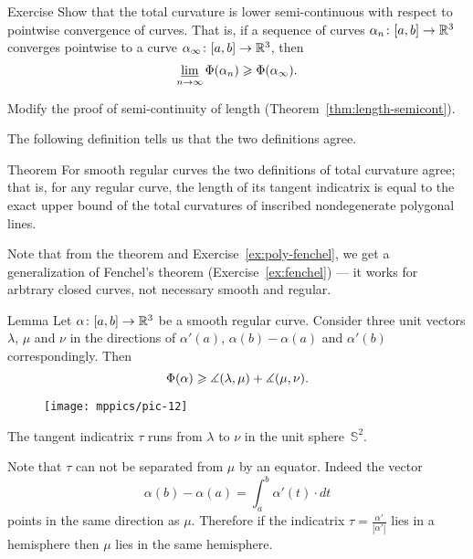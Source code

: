 \begin{thm}{Exercise}
Show that the total curvature is lower semi-continuous with respect to pointwise convergence of curves.
That is, if a sequence
of curves $\alpha_n\colon[a,b]\to \mathbb{R}^3$ converges pointwise 
to a curve $\alpha_\infty\:[a,b]\z\to \RR^3$, then 
\[\varliminf_{n\to\infty} \Phi({\alpha_n}) \geqslant \Phi({\alpha_\infty}).\]
\end{thm}

 Modify the proof of semi-continuity of length (Theorem~\ref{thm:length-semicont}).


The following definition tells us that the two definitions agree.

\begin{thm}{Theorem}\label{thm:total-curvature=}
For smooth regular curves the two definitions of total curvature agree;
that is, for any regular curve, the length of its tangent indicatrix is equal to the exact upper bound of the total curvatures of inscribed nondegenerate polygonal lines.
\end{thm}

Note that from the theorem and Exercise~\ref{ex:poly-fenchel}, we get a generalization of Fenchel's theorem (Exercise~\ref{ex:fenchel}) --- it works for arbtrary closed curves, not necessary smooth and regular.

\begin{thm}{Lemma}\label{lem:uvw}
Let $\alpha\colon[a,b]\to\mathbb{R}^3$ be a smooth regular curve.
Consider three unit vectors $\lambda$, $\mu$ and $\nu$ in the directions of
$\alpha'(a)$, $\alpha(b)-\alpha(a)$ and $\alpha'(b)$ correspondingly.
Then 
\[\Phi({\alpha})\geqslant\measuredangle (\lambda,\mu)+\measuredangle (\mu,\nu).\]
\end{thm}

\begin{wrapfigure}{r}{45 mm}
\vskip-7mm
\centering
\texttt{[image: mppics/pic-12]}
\vskip0mm
\end{wrapfigure}

The tangent indicatrix $\tau$ runs from $\lambda$ to $\nu$ in the unit sphere~$\mathbb{S}^2$.

Note that $\tau$ can not be separated from $\mu$ by an equator.
Indeed the vector 
\[\alpha(b)-\alpha(a)=\int_a^b\alpha'(t)\cdot dt\]
points in the same direction as $\mu$.
Therefore if the indicatrix $\tau=\tfrac{\alpha'}{|\alpha'|}$ lies in a hemisphere then $\mu$ lies in the same hemisphere. 

